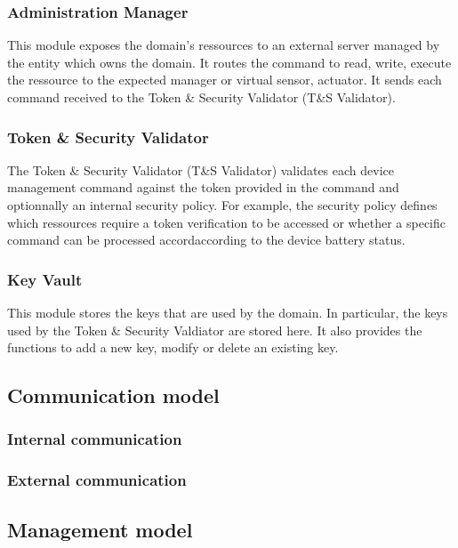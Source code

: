 \documentclass[conference]{IEEEtran}
\begin{document}
\subsubsection{Administration Manager}
\label{sec:Admin_Mgr}
This module exposes the domain's ressources to an external server managed by the entity which owns the domain. It routes the command to read, write, execute the ressource to the expected manager or virtual sensor, actuator. It sends each command received to the Token \& Security Validator (T\&S Validator). 

\subsubsection{Token \& Security Validator}
\label{sec:Token_Validator}
The Token \& Security Validator (T\&S Validator) validates each device management command against the token provided in the command and optionnally an internal security policy. For example, the security policy defines which ressources require a token verification to be accessed or whether a specific command can be processed accordaccording to the device battery status. 

\subsubsection{Key Vault}
\label{sec:Key_Vault}
This module stores the keys that are used by the domain. In particular, the keys used by the Token \& Security Valdiator are stored here. It also provides the functions to add a new key, modify or delete an existing key. 


\subsection{Communication model}
\label{sec:Communication_model}
\subsubsection{Internal communication}
\lipsum[1-6]
\subsubsection{External communication}
\lipsum[1-6]

\subsection{Management model}
\label{sec:Management_model}
\end{document}
